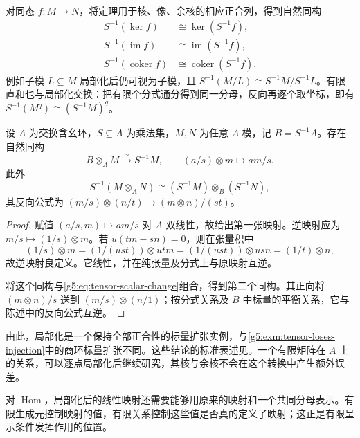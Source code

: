 对同态 \(f:M\rightarrow N\)，将定理用于核、像、余核的相应正合列，得到自然同构
\[
\begin{aligned}
	S^{-1}(\ker f)&\cong\ker(S^{-1}f),\\
	S^{-1}(\operatorname{im}f)&\cong\operatorname{im}(S^{-1}f),\\
	S^{-1}(\operatorname{coker}f)&\cong\operatorname{coker}(S^{-1}f).
\end{aligned}
\]
例如子模 \(L\subseteq M\) 局部化后仍可视为子模，且
\(S^{-1}(M/L)\cong S^{-1}M/S^{-1}L\)。有限直和也与局部化交换：把有限个分式通分得到同一分母，反向再逐个取坐标，即有 \(S^{-1}(M^q)\cong(S^{-1}M)^q\)。

\begin{proposition}\label{g5:prop:localization-tensor}
	设 \(A\) 为交换含幺环，\(S\subseteq A\) 为乘法集，\(M,N\) 为任意 \(A\) 模，记 \(B=S^{-1}A\)。存在自然同构
	\[
		B\otimes_A M\xrightarrow{\ \sim\ }S^{-1}M,\qquad
		(a/s)\otimes m\longmapsto am/s.
	\]
	此外
	\[
		S^{-1}(M\otimes_A N)
		\cong(S^{-1}M)\otimes_B(S^{-1}N),
	\]
	其反向公式为 \((m/s)\otimes(n/t)\mapsto(m\otimes n)/(st)\)。
\end{proposition}
\begin{proof}
	赋值 \((a/s,m)\mapsto am/s\) 对 \(A\) 双线性，故给出第一张映射。逆映射应为 \(m/s\mapsto(1/s)\otimes m\)。若 \(u(tm-sn)=0\)，则在张量积中
	\[
		(1/s)\otimes m=(1/(ust))\otimes utm
		=(1/(ust))\otimes usn=(1/t)\otimes n,
	\]
	故逆映射良定义。它线性，并在纯张量及分式上与原映射互逆。

	将这个同构与\eqref{g5:eq:tensor-scalar-change}组合，得到第二个同构。其正向将 \((m\otimes n)/s\) 送到 \((m/s)\otimes(n/1)\)；按分式关系及 \(B\) 中标量的平衡关系，它与陈述中的反向公式互逆。
\end{proof}

由此，局部化是一个保持全部正合性的标量扩张实例，与\cref{g5:exm:tensor-loses-injection}中的商环标量扩张不同。这些结论的标准表述见\cite[第4节，定理4.4--4.5]{Matsumura1989}。一个有限矩阵在 \(A\) 上的关系，可以逐点局部化后继续研究，其核与余核不会在这个转换中产生额外误差。

\ProseParagraphBreak

对 \(\operatorname{Hom}\)，局部化后的线性映射还需要能够用原来的映射和一个共同分母表示。有限生成元控制映射的值，有限关系控制这些值是否真的定义了映射；这正是有限呈示条件发挥作用的位置。

